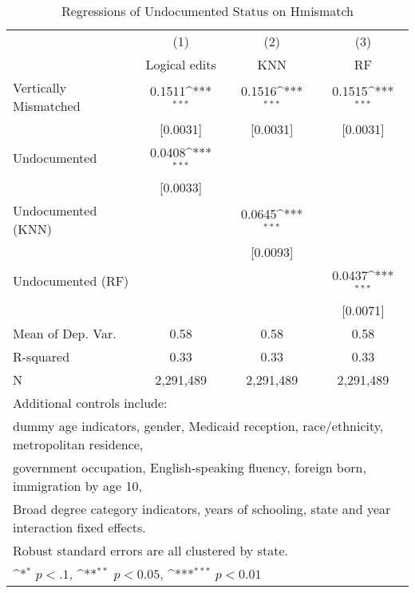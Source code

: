 \begin{table}[htbp]\centering
\def\sym#1{\ifmmode^{#1}\else\(^{#1}\)\fi}
\caption{Regressions of Undocumented Status on Hmismatch}
\begin{tabular}{l*{3}{c}}
\toprule
                    &\multicolumn{1}{c}{(1)}         &\multicolumn{1}{c}{(2)}         &\multicolumn{1}{c}{(3)}         \\
                    &Logical edits         &         KNN         &          RF         \\
\midrule
Vertically Mismatched&      0.1511\sym{***}&      0.1516\sym{***}&      0.1515\sym{***}\\
                    &    [0.0031]         &    [0.0031]         &    [0.0031]         \\
\addlinespace
Undocumented        &      0.0408\sym{***}&                     &                     \\
                    &    [0.0033]         &                     &                     \\
\addlinespace
Undocumented (KNN)  &                     &      0.0645\sym{***}&                     \\
                    &                     &    [0.0093]         &                     \\
\addlinespace
Undocumented (RF)   &                     &                     &      0.0437\sym{***}\\
                    &                     &                     &    [0.0071]         \\
\midrule
Mean of Dep. Var.   &        0.58         &        0.58         &        0.58         \\
R-squared           &        0.33         &        0.33         &        0.33         \\
N                   &   2,291,489         &   2,291,489         &   2,291,489         \\
\bottomrule
\multicolumn{4}{l}{\footnotesize Additional controls include:}\\
\multicolumn{4}{l}{\footnotesize dummy age indicators, gender, Medicaid reception, race/ethnicity, metropolitan residence,}\\
\multicolumn{4}{l}{\footnotesize government occupation, English-speaking fluency, foreign born, immigration by age 10,}\\
\multicolumn{4}{l}{\footnotesize Broad degree category indicators, years of schooling, state and year interaction fixed effects.}\\
\multicolumn{4}{l}{\footnotesize Robust standard errors are all clustered by state.}\\
\multicolumn{4}{l}{\footnotesize \sym{*} \(p<.1\), \sym{**} \(p<0.05\), \sym{***} \(p<0.01\)}\\
\end{tabular}
\end{table}
